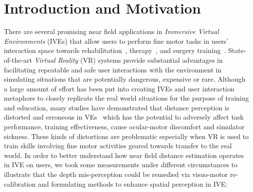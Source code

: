 \chapter{Introduction and Motivation}


There are several promising near field applications in \textit{Immersive Virtual Environments} (IVEs) that allow users to perform fine motor tasks in users' interaction space towards rehabilitation~\cite{DHH+13}, therapy~\cite{HAB+01}, and surgery training~\cite{S08}. State-of-the-art \textit{Virtual Reality} (VR) systems provide substantial advantages in facilitating repeatable and safe user interactions with the environment in simulating situations that are potentially dangerous, expensive or rare. Although a large amount of effort has been put into creating IVEs and user interaction metaphors to closely replicate the real world situations for the purpose of training and education, many studies have demonstrated that distance perception is distorted and erroneous in VEs~\cite{MD05,RW05} which has the potential to adversely affect task performance, training effectiveness, cause ocular-motor discomfort and simulator sickness. These kinds of distortions are problematic especially when VR is used to train skills involving fine motor activities geared towards transfer to the real world. In order to better understand how near field distance estimation operates in IVE on users, we took some measurements under different circumstances to illustrate that the depth mis-perception could be remedied via visuo-motor re-calibration and formulating methods to enhance spatial perception in IVE:

